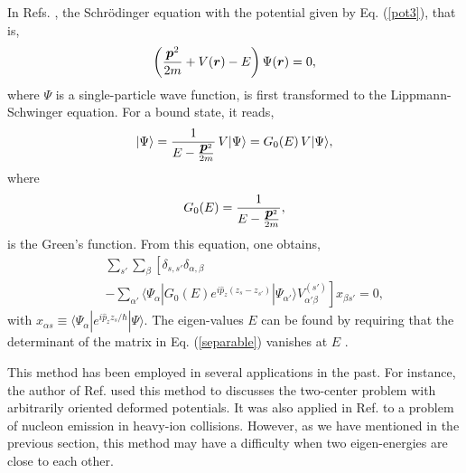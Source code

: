 \documentclass[superscriptaddress,twocolumn,amsmath,amssymb]{revtex4}
\renewcommand{\vec}[1]{\mbox{\boldmath $#1$}}
\begin{document}
In Refs. \cite{GKR79,MR86,GGR77}, the Schr\"odinger equation with 
the potential given by Eq. (\ref{pot3}), that is, 
%
\begin{equation}
\left(\frac{\vec{p}^2}{2m}+V(\vec{r})-E\right)\Psi(\vec{r})=0,
\label{Schrodinger}
\end{equation}
%
where $\Psi$ is a single-particle wave 
function, 
is first transformed to the Lippmann-Schwinger equation. 
For a bound state, it reads, 
%
\begin{equation}
|\Psi\rangle = \frac{1}{E-\frac{\vec{p}^2}{2m}}\,V|\Psi\rangle = G_0(E)\,V|\Psi\rangle, 
\end{equation}
%
where 
%
\begin{equation}
G_0(E)=\frac{1}{E-\frac{\vec{p}^2}{2m}},
\end{equation}
%
is the Green's function. 
From this equation, one obtains, 
%
\begin{eqnarray}
&& \sum_{s'}\sum_\beta\left[
\delta_{s,s'}\delta_{\alpha,\beta}\right. \nonumber \\
&& \left.-\sum_{\alpha'}
\langle\Psi_\alpha|G_0(E)e^{i\hat{p}_z(z_s-z_{s'})}|\Psi_{\alpha'}\rangle
V_{{\alpha'} \beta}^{(s')}
\right]x_{\beta s'}=0,
\label{separable}
\end{eqnarray}
%
with $x_{\alpha s}\equiv \langle \Psi_\alpha|e^{i\hat{p}_zz_s/\hbar}|\Psi\rangle$. 
The eigen-values $E$ can be found by requiring that the 
determinant of the matrix in Eq. (\ref{separable}) 
vanishes at $E$ \cite{GKR79,MR86,GGR77}. 

This method has been employed in several applications in the past. 
For instance, the author of Ref. \cite{Diaz-Torres08} used 
this method to discusses the two-center problem with arbitrarily 
oriented deformed potentials. It was also applied in Ref. \cite{MR86} 
to a problem of nucleon emission in 
heavy-ion collisions.  
However, as we have mentioned in the previous section, this method may have 
a difficulty when two eigen-energies are close to each 
other. 
\end{document}
